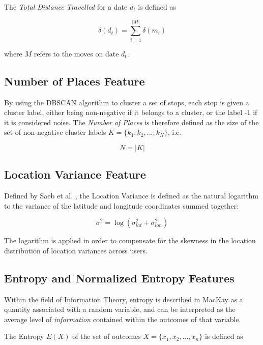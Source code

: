 The \textit{Total Distance Travelled} for a date $d_t$ is defined as 

\begin{equation}
\label{eq:feature-total-distance}
\delta (d_t) = \sum_{i=1}^{|M|} \delta (m_i)
\end{equation}

where $M$ refers to the moves on date $d_t$.

\subsection{Number of Places Feature}
By using the DBSCAN algorithm to cluster a set of stops, each stop is given a cluster label, either being non-negative if it belongs to a cluster, or the label -1 if it is considered noise. The \textit{Number of Places} is therefore defined as the size of the set of non-negative cluster labels $K = \{k_1, k_2, ..., k_N\}$, i.e.

\begin{equation}
\label{eq:feature-num-places}
N = |K|
\end{equation}

\subsection{Location Variance Feature}
Defined by Saeb et al. \cite{Saeb2015}, the Location Variance is defined as the natural logarithm to the variance of the latitude and longitude coordinates summed together: 

\begin{equation}
\label{eq:feature-log-var}
\sigma^2 = \log (\sigma_{lat}^2 + \sigma_{lon}^2)
\end{equation}

The logarithm is applied in order to compensate for the skewness in the location distribution of location variances across users.

\subsection{Entropy and Normalized Entropy Features}
Within the field of Information Theory, entropy is described in MacKay \cite{information-theory} as a quantity associated with a random variable, and can be interpreted as the average level of \textit{information} contained within the outcomes of that variable. 

The Entropy $E(X)$ of the set of outcomes $X = \{x_1, x_2, ..., x_n\}$ is defined as

